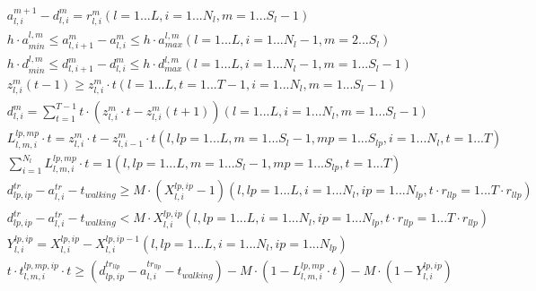 \begin{align}
  & a_{l , i}^{m + 1} - d_{l , i}^{m} = r_{l , i}^{m} \left(l = 1 . . . L , i = 1 . . . N_{l} , m = 1 . . . S_{l} - 1\right) \tag{eq\_0006} \\
  & h \cdot a_{min}^{l , m} \leq a_{l , i + 1}^{m} - a_{l , i}^{m} \leq h \cdot a_{max}^{l , m} \left(l = 1 . . . L , i = 1 . . . N_{l} - 1 , m = 2 . . . S_{l}\right) \tag{eq\_0007} \\
  & h \cdot d_{min}^{l , m} \leq d_{l , i + 1}^{m} - d_{l , i}^{m} \leq h \cdot d_{max}^{l , m} \left(l = 1 . . . L , i = 1 . . . N_{l} - 1 , m = 1 . . . S_{l} - 1\right) \tag{eq\_0008} \\
  & z_{l , i}^{m} \left(t - 1\right) \geq z_{l , i}^{m} \cdot t \left(l = 1 . . . L , t = 1 . . . T - 1 , i = 1 . . . N_{l} , m = 1 . . . S_{l} - 1\right) \tag{eq\_0009} \\
  & d_{l , i}^{m} = \sum_{t = 1}^{T - 1} t \cdot \left(z_{l , i}^{m} \cdot t - z_{l , i}^{m} \left(t + 1\right)\right) \left(l = 1 . . . L , i = 1 . . . N_{l} , m = 1 . . . S_{l} - 1\right) \tag{eq\_0010} \\
  & L_{l , m , i}^{lp , mp} \cdot t = z_{l , i}^{m} \cdot t - z_{l , i - 1}^{m} \cdot t \left(l , lp = 1 . . . L , m = 1 . . . S_{l} - 1 , mp = 1 . . . S_{lp} , i = 1 . . . N_{l} , t = 1 . . . T\right) \tag{eq\_0011} \\
  & \sum_{i = 1}^{N_{l}} L_{l , m , i}^{lp , mp} \cdot t = 1 \left(l , lp = 1 . . . L , m = 1 . . . S_{l} - 1 , mp = 1 . . . S_{lp} , t = 1 . . . T\right) \tag{eq\_0012} \\
  & d_{lp , ip}^{\mathit{tr}} - a_{l , i}^{\mathit{tr}} - t_{\mathit{walking}} \geq M \cdot \left(X_{l , i}^{lp , ip} - 1\right) \left(l , lp = 1 . . . L , i = 1 . . . N_{l} , ip = 1 . . . N_{lp} , t \cdot r_{l lp} = 1 . . . T \cdot r_{l lp}\right) \tag{eq\_0013} \\
  & d_{lp , ip}^{\mathit{tr}} - a_{l , i}^{\mathit{tr}} - t_{\mathit{walking}} < M \cdot X_{l , i}^{lp , ip} \left(l , lp = 1 . . . L , i = 1 . . . N_{l} , ip = 1 . . . N_{lp} , t \cdot r_{l lp} = 1 . . . T \cdot r_{l lp}\right) \tag{eq\_0014} \\
  & Y_{l , i}^{lp , ip} = X_{l , i}^{lp , ip} - X_{l , i}^{lp , ip - 1} \left(l , lp = 1 . . . L , i = 1 . . . N_{l} , ip = 1 . . . N_{lp}\right) \tag{eq\_0015} \\
  & t \cdot t_{l , m , i}^{lp , mp , ip} \cdot t \geq \left(d_{lp , ip}^{t r_{l lp}} - a_{l , i}^{t r_{l lp}} - t_{\mathit{walking}}\right) - M \cdot \left(1 - L_{l , m , i}^{lp , mp} \cdot t\right) - M \cdot \left(1 - Y_{l , i}^{lp , ip}\right) \tag{eq\_0018} \\

\end{align}
